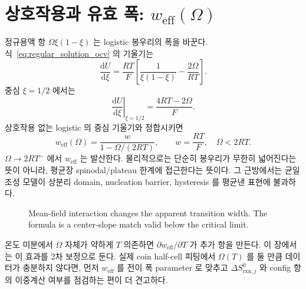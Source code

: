 \documentclass[11pt,a4paper]{article}
\newcommand{\dd}{\mathrm{d}}
\newcommand{\rxn}{\mathrm{rxn}}
\newcommand{\eff}{\mathrm{eff}}
\begin{document}
\section{상호작용과 유효 폭: $w_{\eff}(\Omega)$}
\label{sec:weff}
정규용액 항 $\Omega\xi(1-\xi)$ 는 logistic 봉우리의 폭을 바꾼다. 식~\eqref{eq:regular_solution_ocv} 의
기울기는
\begin{equation}
\frac{\dd U}{\dd \xi}
=\frac{RT}{F}\left[\frac{1}{\xi(1-\xi)}-\frac{2\Omega}{RT}\right].
\label{eq:regular_slope}
\end{equation}
중심 $\xi=1/2$ 에서는
\begin{equation}
\left.\frac{\dd U}{\dd \xi}\right|_{\xi=1/2}
=\frac{4RT-2\Omega}{F}.
\label{eq:center_slope}
\end{equation}
상호작용 없는 logistic 의 중심 기울기와 정합시키면
\begin{equation}
\boxed{\;
w_{\eff}(\Omega)=\frac{w}{1-\Omega/(2RT)},\qquad w=\frac{RT}{F},\quad \Omega<2RT.
\;}
\label{eq:weff}
\end{equation}
$\Omega\rightarrow2RT^{-}$ 에서 $w_{\eff}$ 는 발산한다. 물리적으로는 단순히 봉우리가 무한히 넓어진다는
뜻이 아니라, 평균장 spinodal/plateau 한계에 접근한다는 뜻이다. 그 근방에서는 균일 조성 모델이
상분리 domain, nucleation barrier, hysteresis 를 평균낸 표현에 불과하다.

\begin{figure}[t]
\centering
{}
\caption{Mean-field interaction changes the apparent transition width. The
formula is a center-slope match valid below the critical limit.}
\label{fig:weff}
\end{figure}

온도 미분에서 $\Omega$ 자체가 약하게 $T$ 의존하면 $\partial w_{\eff}/\partial T$ 가 추가 항을 만든다.
이 장에서는 이 효과를 2차 보정으로 둔다. 실제 coin half-cell 피팅에서 $\Omega(T)$ 를 둘 만큼 데이터가
충분하지 않다면, 먼저 $w_{\eff}$ 를 전이 폭 parameter 로 맞추고 $\Delta S_{\rxn,j}^0$ 와 config 항의
이중계산 여부를 점검하는 편이 더 견고하다.
\end{document}
